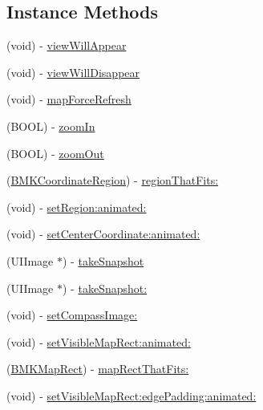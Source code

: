 \subsection*{Instance Methods}
\begin{DoxyCompactItemize}
\item 
(void) -\/ \hyperlink{interface_b_m_k_map_view_a6ce8ac560bd901b93b3e15d6996a409a}{view\+Will\+Appear}
\item 
(void) -\/ \hyperlink{interface_b_m_k_map_view_a0cfbfc217062e84de41ddb04dcad7e67}{view\+Will\+Disappear}
\item 
(void) -\/ \hyperlink{interface_b_m_k_map_view_a952993ae3b36628c1e16acf78f3b0b4a}{map\+Force\+Refresh}
\item 
(B\+O\+O\+L) -\/ \hyperlink{interface_b_m_k_map_view_a349f7c74871a389d73955edd7bcd9fdf}{zoom\+In}
\item 
(B\+O\+O\+L) -\/ \hyperlink{interface_b_m_k_map_view_a1806c818757917ef674ebe5ba24fe5a2}{zoom\+Out}
\item 
(\hyperlink{struct_b_m_k_coordinate_region}{B\+M\+K\+Coordinate\+Region}) -\/ \hyperlink{interface_b_m_k_map_view_a5a1387f64868bf341cbf743063a91d28}{region\+That\+Fits\+:}
\item 
(void) -\/ \hyperlink{interface_b_m_k_map_view_af182240990fe7ad8ff8b709456200fed}{set\+Region\+:animated\+:}
\item 
(void) -\/ \hyperlink{interface_b_m_k_map_view_a02c0933bb56354f30695a6634e416e26}{set\+Center\+Coordinate\+:animated\+:}
\item 
(U\+I\+Image $\ast$) -\/ \hyperlink{interface_b_m_k_map_view_af2af641b86f327aa9f2a16050d380db2}{take\+Snapshot}
\item 
(U\+I\+Image $\ast$) -\/ \hyperlink{interface_b_m_k_map_view_a09fa7c95a30d88f468bcd3492772d63f}{take\+Snapshot\+:}
\item 
(void) -\/ \hyperlink{interface_b_m_k_map_view_a59e7f72968a298303b265444d9cab586}{set\+Compass\+Image\+:}
\item 
(void) -\/ \hyperlink{interface_b_m_k_map_view_ad90d3e9ceabed218dcb90d9fc8247902}{set\+Visible\+Map\+Rect\+:animated\+:}
\item 
(\hyperlink{struct_b_m_k_map_rect}{B\+M\+K\+Map\+Rect}) -\/ \hyperlink{interface_b_m_k_map_view_a58f9c0d783d39cd0d028ae94ca408de8}{map\+Rect\+That\+Fits\+:}
\item 
(void) -\/ \hyperlink{interface_b_m_k_map_view_a1e5a69629b90ac2f571284e2e6c32397}{set\+Visible\+Map\+Rect\+:edge\+Padding\+:animated\+:}
\item 

\end{DoxyCompactItemize}

